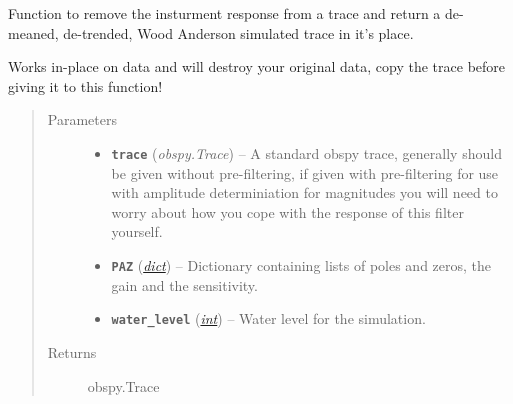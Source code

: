 \documentclass[a4paper,10pt,english]{sphinxmanual}
\begin{document}
\begin{fulllineitems}
\label{utils:mag_calc._sim_WA}
Function to remove the insturment response from a trace and return a
de-meaned, de-trended, Wood Anderson simulated trace in it's place.

Works in-place on data and will destroy your original data, copy the
trace before giving it to this function!
\begin{quote}\begin{description}
\item[{Parameters}] \leavevmode\begin{itemize}
\item {} 
\textbf{\texttt{trace}} (\emph{obspy.Trace}) -- A standard obspy trace, generally should be given without
pre-filtering, if given with pre-filtering for use with
amplitude determiniation for magnitudes you will need to
worry about how you cope with the response of this filter
yourself.

\item {} 
\textbf{\texttt{PAZ}} (\href{https://docs.python.org/library/stdtypes.html\#dict}{\emph{dict}}) -- Dictionary containing lists of poles and zeros, the gain and
the sensitivity.

\item {} 
\textbf{\texttt{water\_level}} (\href{https://docs.python.org/library/functions.html\#int}{\emph{int}}) -- Water level for the simulation.

\end{itemize}

\item[{Returns}] \leavevmode
obspy.Trace

\end{description}\end{quote}

\end{fulllineitems}

\end{document}
